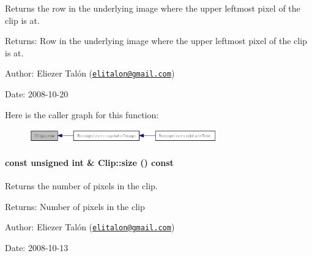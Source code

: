 Returns the row in the underlying image where the upper leftmost pixel of the clip is at. 

\begin{Desc}
\item[Returns:]Row in the underlying image where the upper leftmost pixel of the clip is at.\end{Desc}
\begin{Desc}
\item[Author:]Eliezer Talón (\href{mailto:elitalon@gmail.com}{\tt elitalon@gmail.com}) \end{Desc}
\begin{Desc}
\item[Date:]2008-10-20 \end{Desc}


Here is the caller graph for this function:\nopagebreak
\begin{figure}[H]
\begin{center}
\leavevmode
\includegraphics[width=230pt]{class_clip_1a1d1fd626d1325f0f2b9184de4c89b8_icgraph}
\end{center}
\end{figure}
\hypertarget{class_clip_eb6b12a1a0570b529d6a09633b991fcd}{
\paragraph[{size}]{\setlength{\rightskip}{0pt plus 5cm}const unsigned int \& Clip::size () const}\hfill}
\label{class_clip_eb6b12a1a0570b529d6a09633b991fcd}


Returns the number of pixels in the clip. 

\begin{Desc}
\item[Returns:]Number of pixels in the clip\end{Desc}
\begin{Desc}
\item[Author:]Eliezer Talón (\href{mailto:elitalon@gmail.com}{\tt elitalon@gmail.com}) \end{Desc}
\begin{Desc}
\item[Date:]2008-10-13 \end{Desc}


